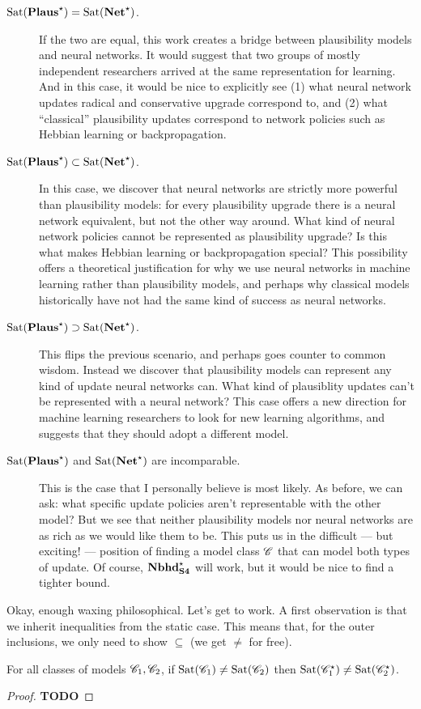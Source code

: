 \documentclass[letterpaper]{article}
\begin{document}
\begin{description}
    \item[$\mathrm{Sat}( \textrm{\textbf{Plaus}}^\star ) = \mathrm{Sat}( \textrm{\textbf{Net}}^\star )$.] If the two are equal, this work creates a bridge between plausibility models and neural networks.  It would suggest that two groups of mostly independent researchers arrived at the same representation for learning.  And in this case, it would be nice to explicitly see (1) what neural network updates radical and conservative upgrade correspond to, and (2) what ``classical'' plausibility updates correspond to network policies such as Hebbian learning or backpropagation.
    \item[$\mathrm{Sat}( \textrm{\textbf{Plaus}}^\star ) \subset \mathrm{Sat}( \textrm{\textbf{Net}}^\star )$.] In this case, we discover that neural networks are strictly more powerful than plausibility models: for every plausibility upgrade there is a neural network equivalent, but not the other way around.  What kind of neural network policies cannot be represented as plausibility upgrade?  Is this what makes Hebbian learning or backpropagation special?  This possibility offers a theoretical justification for why we use neural networks in machine learning rather than plausibility models, and perhaps why classical models historically have not had the same kind of success as neural networks.
    \item[$\mathrm{Sat}( \textrm{\textbf{Plaus}}^\star ) \supset \mathrm{Sat}( \textrm{\textbf{Net}}^\star )$.] This flips the previous scenario, and perhaps goes counter to common wisdom.  Instead we discover that plausibility models can represent any kind of update neural networks can.  What kind of plausiblity updates can't be represented with a neural network?  This case offers a new direction for machine learning researchers to look for new learning algorithms, and suggests that they should adopt a different model. 
    \item[$\mathrm{Sat}( \textrm{\textbf{Plaus}}^\star )$ and $\mathrm{Sat}( \textrm{\textbf{Net}}^\star )$ are incomparable.] This is the case that I personally believe is most likely.  As before, we can ask: what specific update policies aren't representable with the other model?  But we see that neither plausibility models nor neural networks are as rich as we would like them to be.  This puts us in the difficult --- but exciting! --- position of finding a model class $\mathscr{C}$ that can model both types of update.  Of course, $\textrm{\textbf{Nbhd}}_\textrm{\textbf{S4}}^\star$ will work, but it would be nice to find a tighter bound.
\end{description}

Okay, enough waxing philosophical. Let's get to work. A first observation is that we inherit inequalities from the static case.  This means that, for the outer inclusions, we only need to show $\subseteq$ (we get $\ne$ for free).
\begin{lemma}
    For all classes of models $\mathscr{C}_1, \mathscr{C}_2$, if $\mathrm{Sat}( \mathscr{C}_1 ) \ne \mathrm{Sat}( \mathscr{C}_2 )$ then $\mathrm{Sat}( \mathscr{C}_1^\star ) \ne \mathrm{Sat}( \mathscr{C}_2^\star )$.
\end{lemma}
\begin{proof}
    \textbf{TODO}
\end{proof}
\end{document}
